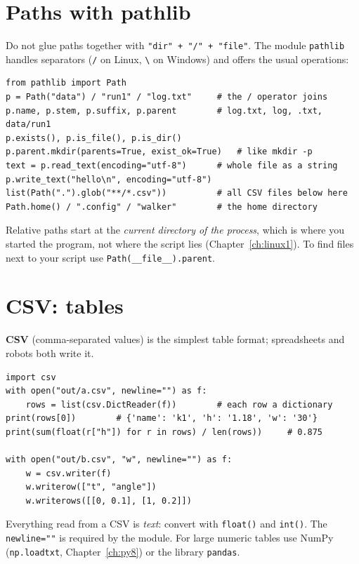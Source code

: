\section*{Paths with pathlib}
Do not glue paths together with \verb!"dir" + "/" + "file"!. The module \texttt{pathlib} handles separators (\texttt{/} on Linux, \texttt{\textbackslash} on Windows) and offers the usual operations:
\begin{verbatim}
from pathlib import Path
p = Path("data") / "run1" / "log.txt"     # the / operator joins
p.name, p.stem, p.suffix, p.parent        # log.txt, log, .txt, data/run1
p.exists(), p.is_file(), p.is_dir()
p.parent.mkdir(parents=True, exist_ok=True)   # like mkdir -p
text = p.read_text(encoding="utf-8")      # whole file as a string
p.write_text("hello\n", encoding="utf-8")
list(Path(".").glob("**/*.csv"))          # all CSV files below here
Path.home() / ".config" / "walker"        # the home directory
\end{verbatim}
Relative paths start at the \emph{current directory of the process}, which is where you started the program, not where the script lies (Chapter~\ref{ch:linux1}). To find files next to your script use \verb!Path(__file__).parent!.

\section*{CSV: tables}
\textbf{CSV} (comma-separated values) is the simplest table format; spreadsheets and robots both write it.
\begin{verbatim}
import csv
with open("out/a.csv", newline="") as f:
    rows = list(csv.DictReader(f))        # each row a dictionary
print(rows[0])        # {'name': 'k1', 'h': '1.18', 'w': '30'}
print(sum(float(r["h"]) for r in rows) / len(rows))     # 0.875

with open("out/b.csv", "w", newline="") as f:
    w = csv.writer(f)
    w.writerow(["t", "angle"])
    w.writerows([[0, 0.1], [1, 0.2]])
\end{verbatim}
Everything read from a CSV is \emph{text}: convert with \texttt{float()} and \texttt{int()}. The \texttt{newline=""} is required by the module. For large numeric tables use NumPy (\texttt{np.loadtxt}, Chapter~\ref{ch:py8}) or the library \texttt{pandas}.

